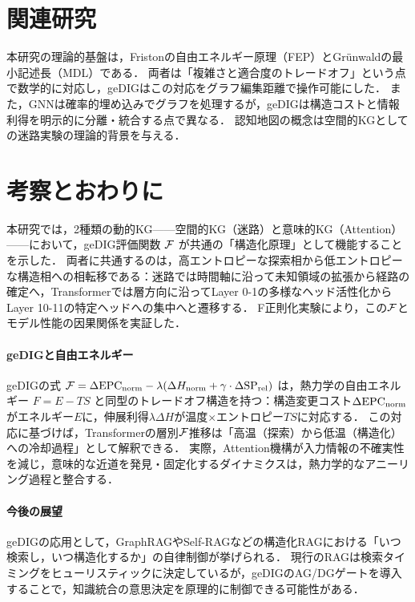 
\section{関連研究}
本研究の理論的基盤は，Fristonの自由エネルギー原理（FEP）\cite{friston2010}とGr\"{u}nwaldの最小記述長（MDL）\cite{grunwald2007}である．
両者は「複雑さと適合度のトレードオフ」という点で数学的に対応し\cite{tishby2000}，geDIGはこの対応をグラフ編集距離\cite{bunke1997}で操作可能にした．
また，GNN\cite{kipf2017}は確率的埋め込みでグラフを処理するが，geDIGは構造コストと情報利得を明示的に分離・統合する点で異なる．
認知地図の概念\cite{okeefe1978}は空間的KGとしての迷路実験の理論的背景を与える．

\section{考察とおわりに}

本研究では，2種類の動的KG——空間的KG（迷路）と意味的KG（Attention）——において，geDIG評価関数 $\mathcal{F}$ が共通の「構造化原理」として機能することを示した．
両者に共通するのは，高エントロピーな探索相から低エントロピーな構造相への相転移である：迷路では時間軸に沿って未知領域の拡張から経路の確定へ，Transformerでは層方向に沿ってLayer 0-1の多様なヘッド活性化からLayer 10-11の特定ヘッドへの集中へと遷移する．
F正則化実験により，この$\mathcal{F}$とモデル性能の因果関係を実証した．

\paragraph{geDIGと自由エネルギー}
geDIGの式 $\mathcal{F} = \Delta\mathrm{EPC}_{\mathrm{norm}} - \lambda(\Delta H_{\mathrm{norm}} + \gamma \cdot \Delta \mathrm{SP}_{\mathrm{rel}})$ は，熱力学の自由エネルギー $F = E - TS$ と同型のトレードオフ構造を持つ：構造変更コスト$\Delta\mathrm{EPC}_{\mathrm{norm}}$がエネルギー$E$に，伸展利得$\lambda \Delta H$が温度$\times$エントロピー$TS$に対応する．
この対応に基づけば，Transformerの層別$\mathcal{F}$推移は「高温（探索）から低温（構造化）への冷却過程」として解釈できる．
実際，Attention機構が入力情報の不確実性を減じ，意味的な近道を発見・固定化するダイナミクスは，熱力学的なアニーリング過程と整合する．

\paragraph{今後の展望}
geDIGの応用として，GraphRAG\cite{edge2024}やSelf-RAG\cite{asai2023}などの構造化RAGにおける「いつ検索し，いつ構造化するか」の自律制御が挙げられる．
現行のRAGは検索タイミングをヒューリスティックに決定しているが，geDIGのAG/DGゲートを導入することで，知識統合の意思決定を原理的に制御できる可能性がある．

